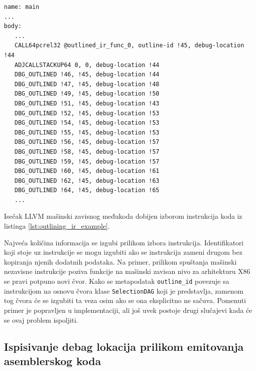 \documentclass[12pt,oneside]{memoir}
\begin{document}
\begin{listing}[!ht]
\begin{verbatim}
name: main
...
body:
   ...
   CALL64pcrel32 @outlined_ir_func_0, outline-id !45, debug-location !44
   ADJCALLSTACKUP64 0, 0, debug-location !44
   DBG_OUTLINED !46, !45, debug-location !44
   DBG_OUTLINED !47, !45, debug-location !48
   DBG_OUTLINED !49, !45, debug-location !50
   DBG_OUTLINED !51, !45, debug-location !43
   DBG_OUTLINED !52, !45, debug-location !53
   DBG_OUTLINED !54, !45, debug-location !53
   DBG_OUTLINED !55, !45, debug-location !53
   DBG_OUTLINED !56, !45, debug-location !57
   DBG_OUTLINED !58, !45, debug-location !57
   DBG_OUTLINED !59, !45, debug-location !57
   DBG_OUTLINED !60, !45, debug-location !61
   DBG_OUTLINED !62, !45, debug-location !63
   DBG_OUTLINED !64, !45, debug-location !65
   ...
\end{verbatim}
\caption{Isečak LLVM mašinski zavisnog međukoda dobijen izborom instrukcija koda iz listinga \ref{lst:outlining_ir_example}.}
\label{lst:outlining_mir_example}
\end{listing}

Najveća količina informacija se izgubi prilikom izbora instrukcija.
Identifikatori koji stoje uz instrukcije se mogu izgubiti ako se instrukcija zameni drugom bez kopiranja njenih dodatnih podataka.
Na primer, prilikom spuštanja mašinski nezavisne instrukcije poziva funkcije na mašinski zavisan nivo za arhitekturu X86 se pravi potpuno novi čvor.
Kako se metapodatak \verb|outline_id| povezuje sa instrukcijom na osnovu čvora klase \verb|SelectionDAG| koji je predstavlja, zamenom tog čvora će se izgubiti ta veza osim ako se ona eksplicitno ne sačuva.
Pomenuti primer je popravljen u implementaciji, ali još uvek postoje drugi slučajevi kada će se ovaj problem ispoljiti.

\subsection{Ispisivanje debag lokacija prilikom emitovanja asemblerskog koda}

\end{document}
